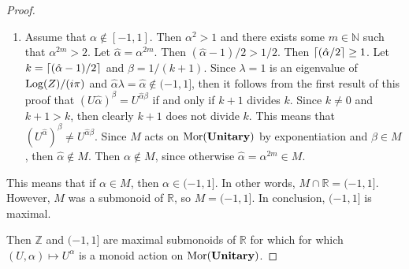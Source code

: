 \begin{proof}
\begin{itemize}
\begin{enumerate}
                Since $1/2 \in M$, then $\alpha \not \in M$, since $M$ acts on $\Mor( \CatUnitary )$ by exponentiation.
          \item Assume that $\alpha \not \in [ -1, 1 ]$.
                Then $\alpha^2 > 1$ and there exists some $m \in \mathbb{N}$ such that $\alpha^{2m} > 2$.
                Let $\hat{\alpha} = \alpha^{2m}$.
                Then $( \hat{\alpha} - 1 ) / 2 > 1 / 2$.
                Then $\ceil*{( \hat{\alpha} / 2} \ge 1$.
                Let $k = \ceil*{( \hat{\alpha} - 1 ) / 2}$ and $\beta = 1 / ( k + 1 )$.
                Since $\lambda = 1$ is an eigenvalue of $\Log( Z ) / (i\pi)$ and $\hat{\alpha}\lambda = \hat{\alpha} \not \in ( -1, 1 ]$, then it follows from the first result of this proof that $( U{\hat{\alpha}} )^\beta = U^{\hat{\alpha}\beta}$ if and only if $k + 1$ divides $k$.
                Since $k \ne 0$ and $k + 1 > k$, then clearly $k + 1$ does not divide $k$.
                This means that $( U^{\hat{\alpha}} )^\beta \ne U^{\hat{\alpha}\beta}$.
                Since $M$ acts on $\Mor( \CatUnitary )$ by exponentiation and $\beta \in M$, then $\hat{\alpha} \not \in M$.
                Then $\alpha \not \in M$, since otherwise $\hat{\alpha} = \alpha^{2m} \in M$.
          \end{enumerate}
          This means that if $\alpha \in M$, then $\alpha \in ( -1, 1 ]$.
          In other words, $M \cap \mathbb{R} = ( -1, 1 ]$.
          However, $M$ was a submonoid of $\mathbb{R}$, so $M = ( -1, 1 ]$.
          In conclusion, $( -1, 1 ]$ is maximal.
    \end{itemize}
    Then $\mathbb{Z}$ and $( -1, 1 ]$ are maximal submonoids of $\mathbb{R}$ for which for which $( U, \alpha ) \mapsto U^\alpha$ is a monoid action on $\Mor( \CatUnitary )$.
\end{proof}